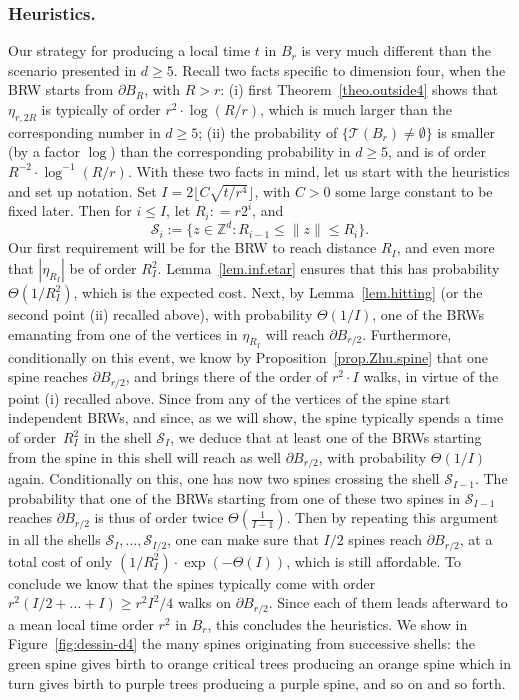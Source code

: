 \documentclass[11pt]{article}
\numberwithin{equation}{section}
\theoremstyle{plain}
\theoremstyle{definition}
\newcommand{\1}{{\text{\Large $\mathfrak 1$}}}
\begin{document}
\subsubsection*{Heuristics.}
Our strategy for producing a local time $t$ in $B_r$
is very much different than the scenario presented in $d\ge 5$.
Recall
two facts specific to dimension four, when the BRW starts from $\partial B_R$, with $R>r$: (i) first Theorem~\ref{theo.outside4} shows that $\eta_{r,2R}$
is typically of order
$r^2\cdot \log(R/r)$, which is much larger than the corresponding
number in $d\ge 5$; (ii) the probability of $\{\mathcal T(B_r) \neq
\emptyset\}$ is smaller (by a factor $\log$) than the corresponding
probability in $d\ge 5$, and is of order $R^{-2}\cdot\log^{-1}(R/r)$.
With these two facts in mind, let us start with the heuristics and
set up notation.
Set $I = 2\lfloor C\sqrt{t/r^4}\rfloor $, with $C>0$ some large constant to be fixed later.
Then for $i\le I$, let $R_i: = r 2^i$, and
\[
\mathcal S_i:= \{z\in \mathbb Z^d : R_{i-1} \le \|z\|\le R_i\}.
\]
Our first requirement will be for the BRW to reach distance $R_I$,
and even more that $|\eta_{R_I}|$ be of order $R_I^2$.
Lemma~\ref{lem.inf.etar} ensures that this has probability $\Theta(1/R_I^2)$, which is the expected cost.
Next, by Lemma~\ref{lem.hitting} (or the second point (ii) recalled above), with probability $\Theta(1/I)$, one of the BRWs emanating from one of the vertices in $\eta_{R_I}$ will reach $\partial B_{r/2}$.
Furthermore, conditionally on this event,
we know by Proposition~\ref{prop.Zhu.spine}
that one spine reaches $\partial B_{r/2}$, and brings there of the order
of $r^2\cdot I$ walks, in virtue of the point (i) recalled above.
Since from any of the vertices of the spine start independent BRWs,
and since, as we will show, the spine typically spends a time
of order~$R_I^2$ in the shell $\mathcal S_I$,
we deduce that at least one of the BRWs starting from the
spine in this shell will reach as well $\partial B_{r/2}$,
with probability $\Theta(1/I)$ again.
Conditionally on this, one has now two spines
crossing the shell $\mathcal S_{I-1}$.
The probability that one of the BRWs starting from one of these two spines in $\mathcal S_{I-1}$ reaches $\partial B_{r/2}$ is thus of
order twice $\Theta(\frac 1{I-1})$. Then by repeating this argument in all the shells $\mathcal S_I,\dots,\mathcal S_{I/2}$,
one can make sure that $I/2$ spines reach $\partial B_{r/2}$, at a total cost of only
$(1/R_I^2)\cdot \exp(-\Theta(I))$, which is still affordable.
To conclude we know that the spines typically come with
order $r^2(I/2+\dots+I)\ge r^2I^2/4$ walks on $\partial B_{r/2}$.
Since each of them leads afterward to a mean local time order
$r^2$ in $B_r$, this concludes the heuristics. We show in
Figure~\ref{fig:dessin-d4} the many spines originating from successive
shells: the green spine gives birth to orange critical trees producing
an orange spine which in turn gives birth to purple trees producing
a purple spine, and so on and so forth.
\end{document}
